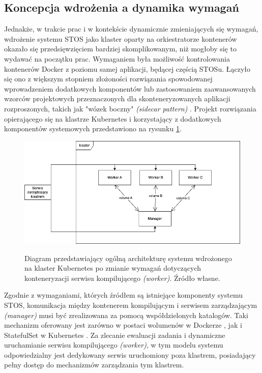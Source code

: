 \subsection{Koncepcja wdrożenia a dynamika wymagań}
Jednakże, w trakcie prac i w kontekście dynamicznie zmieniających się wymagań, wdrożenie systemu STOS jako klaster oparty na orkiestratorze kontenerów okazało się przedsięwzięciem bardziej skomplikowanym, niż mogłoby się to wydawać na początku prac. Wymaganiem była możliwość kontrolowania kontenerów Docker z poziomu samej aplikacji, będącej częścią STOSu. Łączyło się ono z większym stopniem złożoności rozwiązania spowodowanej wprowadzeniem dodatkowych komponentów lub zastosowaniem zaawansowanych wzorców projektowych przeznaczonych dla skonteneryzowanych aplikacji rozproszonych, takich jak "wózek boczny" \textit{(sidecar pattern)} \cite{k8sPatterns}. Projekt rozwiązania opierającego się na klastrze Kubernetes i korzystający z dodatkowych komponentów systemowych przedstawiono na rysunku \ref{diagramk8sFinal}.

\begin{figure}[!h]
	\begin{center}
		\resizebox{0.7\textwidth}{!} {
			\includegraphics{img/4/k8sFinal.png}
		}
		\caption[Diagram prototypu klastra Kubernetes po zmianie architektury]{Diagram przedstawiający ogólną architekturę systemu wdrożonego na klaster Kubernetes po zmianie wymagań dotyczących konteneryzacji serwisu kompilującego \textit{(worker)}. Źródło własne.}
		\label{diagramk8sFinal}
	\end{center}
\end{figure}

Zgodnie z wymaganiami, których źródłem są istniejące komponenty systemu STOS, komunikacja między kontenerem kompilującym i serwisem zarządzającym \textit{(manager)} musi być zrealizowana za pomocą współdzielonych katalogów. Taki mechanizm oferowany jest zarówno w postaci wolumenów w Dockerze \cite{dockerVolume}, jak i StatefulSet w Kubernetes \cite{k8sStateful}. Za zlecanie ewaluacji zadania i dynamiczne uruchamianie serwisu kompilującego \textit{(worker)}, w tym modelu systemu odpowiedzialny jest dedykowany serwis uruchomiony poza klastrem, posiadający pełny dostęp do mechanizmów zarządzania tym klastrem.

